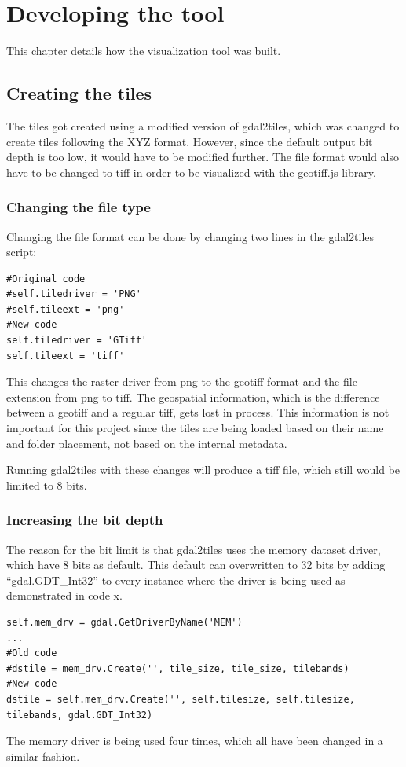 \chapter{Developing the tool}
This chapter details how the visualization tool was built.

\section{Creating the tiles}
The tiles got created using a modified version of gdal2tiles, which was changed to create tiles following the XYZ format. However, since the default output bit depth is too low, it would have to be modified further. The file format would also have to be changed to tiff in order to be visualized with the geotiff.js library. 

\subsection{Changing the file type}
Changing the file format can be done by changing two lines in the gdal2tiles script:

\begin{lstlisting}[language=iPython, caption={Changing the file format}, label= VoresPY,escapechar=|]
#Original code
#self.tiledriver = 'PNG'
#self.tileext = 'png'
#New code
self.tiledriver = 'GTiff'
self.tileext = 'tiff'
\end{lstlisting}
This changes the raster driver from png to the geotiff format and the file extension from png to tiff. 
\citep{RasterDrivers}
The geospatial information, which is the difference between a geotiff and a regular tiff, gets lost in process. This information is not important for this project since the tiles are being loaded based on their name and folder placement, not based on the internal metadata.

Running gdal2tiles with these changes will produce a tiff file, which still would be limited to 8 bits. 
\subsection{Increasing the bit depth}
The reason for the bit limit is that gdal2tiles uses the memory dataset driver, which have 8 bits as default.  This default can overwritten to 32 bits by adding “gdal.GDT\_Int32” to every instance where the driver is being used as demonstrated in code x. 
\citep{MoreThan8}

\begin{lstlisting}[language=iPython, caption={Increasing the bit depth}, label= VoresPY,escapechar=|]
self.mem_drv = gdal.GetDriverByName('MEM')
...
#Old code
#dstile = mem_drv.Create('', tile_size, tile_size, tilebands)
#New code
dstile = self.mem_drv.Create('', self.tilesize, self.tilesize, tilebands, gdal.GDT_Int32)
\end{lstlisting}
The memory driver is being used four times, which all have been changed in a similar fashion.


